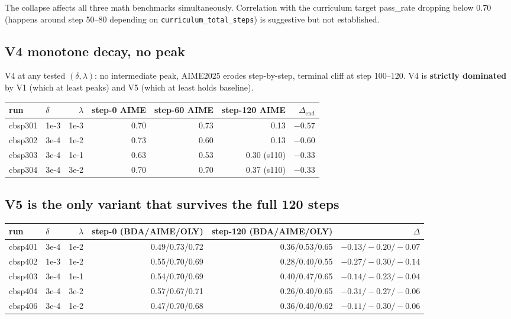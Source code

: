 \documentclass[10pt]{article}
\begin{document}
\noindent The collapse affects all three math benchmarks
simultaneously. Correlation with the curriculum target pass\_rate
dropping below 0.70 (happens around step 50--80 depending on
\texttt{curriculum\_total\_steps}) is suggestive but not established.

\subsection{V4 monotone decay, no peak}

V4 at any tested $(\delta, \lambda)$: no intermediate peak, AIME2025
erodes step-by-step, terminal cliff at step 100--120. V4 is
\textbf{strictly dominated} by V1 (which at least peaks) and V5
(which at least holds baseline).

\begin{center}
\begin{tabular}{llrrrrr}
\toprule
run     & $\delta$  & $\lambda$ & step-0 AIME & step-60 AIME & step-120 AIME & $\Delta_{\mathrm{end}}$ \\
\midrule
cbsp301 & 1e-3      & 1e-3      & 0.70        & 0.73         & 0.13          & $-0.57$ \\
cbsp302 & 3e-4      & 1e-2      & 0.73        & 0.60         & 0.13          & $-0.60$ \\
cbsp303 & 3e-4      & 1e-1      & 0.63        & 0.53         & 0.30 (s110)   & $-0.33$ \\
cbsp304 & 3e-4      & 3e-2      & 0.70        & 0.70         & 0.37 (s110)   & $-0.33$ \\
\bottomrule
\end{tabular}
\end{center}

\subsection{V5 is the only variant that survives the full 120 steps}

\begin{center}
\begin{tabular}{llrrrr}
\toprule
run     & $\delta$  & $\lambda$ & step-0 (BDA/AIME/OLY) & step-120 (BDA/AIME/OLY) & $\Delta$ \\
\midrule
cbsp401 & 3e-4      & 1e-2      & 0.49/0.73/0.72        & 0.36/0.53/0.65          & $-0.13/-0.20/-0.07$ \\
cbsp402 & 1e-3      & 1e-2      & 0.55/0.70/0.69        & 0.28/0.40/0.55          & $-0.27/-0.30/-0.14$ \\
cbsp403 & 3e-4      & 1e-1      & 0.54/0.70/0.69        & 0.40/0.47/0.65          & $-0.14/-0.23/-0.04$ \\
cbsp404 & 3e-4      & 3e-2      & 0.57/0.67/0.71        & 0.26/0.40/0.65          & $-0.31/-0.27/-0.06$ \\
cbsp406 & 3e-4      & 1e-2      & 0.47/0.70/0.68        & 0.36/0.40/0.62          & $-0.11/-0.30/-0.06$ \\
\bottomrule
\end{tabular}
\end{center}
\end{document}
